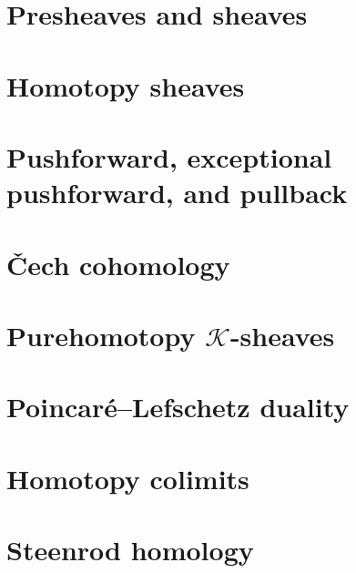 \chapter{Presheaves and sheaves}



\chapter{Homotopy sheaves}



\chapter{Pushforward, exceptional pushforward, and pullback}



\chapter{\v{C}ech cohomology}



\chapter{Purehomotopy $\mathcal{K}$-sheaves}



\chapter{Poincaré–Lefschetz duality}



\chapter{Homotopy colimits}



\chapter{Steenrod homology}





